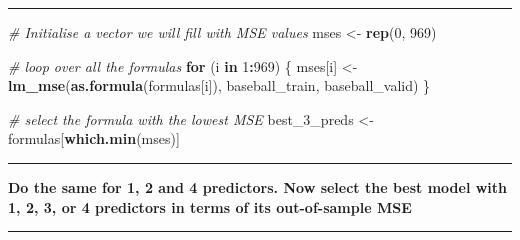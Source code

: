 \documentclass[12pt,]{article}
\newenvironment{Shaded}{\begin{snugshade}}{\end{snugshade}}
\newcommand{\CommentTok}[1]{\textcolor[rgb]{0.56,0.35,0.01}{\textit{#1}}}
\newcommand{\ControlFlowTok}[1]{\textcolor[rgb]{0.13,0.29,0.53}{\textbf{#1}}}
\newcommand{\DecValTok}[1]{\textcolor[rgb]{0.00,0.00,0.81}{#1}}
\newcommand{\KeywordTok}[1]{\textcolor[rgb]{0.13,0.29,0.53}{\textbf{#1}}}
\newcommand{\NormalTok}[1]{#1}
\newcommand{\OperatorTok}[1]{\textcolor[rgb]{0.81,0.36,0.00}{\textbf{#1}}}
\newcommand{\StringTok}[1]{\textcolor[rgb]{0.31,0.60,0.02}{#1}}
\begin{document}
\begin{center}\rule{0.5\linewidth}{\linethickness}\end{center}

\begin{Shaded}
\begin{Highlighting}[]
\CommentTok{# Initialise a vector we will fill with MSE values}
\NormalTok{mses <-}\StringTok{ }\KeywordTok{rep}\NormalTok{(}\DecValTok{0}\NormalTok{, }\DecValTok{969}\NormalTok{)}

\CommentTok{# loop over all the formulas}
\ControlFlowTok{for}\NormalTok{ (i }\ControlFlowTok{in} \DecValTok{1}\OperatorTok{:}\DecValTok{969}\NormalTok{) \{}
\NormalTok{  mses[i] <-}\StringTok{ }\KeywordTok{lm_mse}\NormalTok{(}\KeywordTok{as.formula}\NormalTok{(formulas[i]), baseball_train, baseball_valid)}
\NormalTok{\}}

\CommentTok{# select the formula with the lowest MSE}
\NormalTok{best_}\DecValTok{3}\NormalTok{_preds <-}\StringTok{ }\NormalTok{formulas[}\KeywordTok{which.min}\NormalTok{(mses)]}
\end{Highlighting}
\end{Shaded}

\begin{center}\rule{0.5\linewidth}{\linethickness}\end{center}

\textbf{Do the same for 1, 2 and 4 predictors. Now select the best model
with 1, 2, 3, or 4 predictors in terms of its out-of-sample MSE}

\begin{center}\rule{0.5\linewidth}{\linethickness}\end{center}
\end{document}
